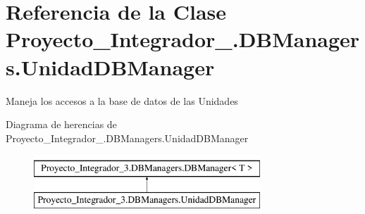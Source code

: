 \hypertarget{class_proyecto___integrador__3_1_1_d_b_managers_1_1_unidad_d_b_manager}{\section{Referencia de la Clase Proyecto\-\_\-\-Integrador\-\_.\-D\-B\-Managers.\-Unidad\-D\-B\-Manager}
\label{class_proyecto___integrador__3_1_1_d_b_managers_1_1_unidad_d_b_manager}
}


Maneja los accesos a la base de datos de las Unidades  


Diagrama de herencias de Proyecto\-\_\-\-Integrador\-\_.\-D\-B\-Managers.\-Unidad\-D\-B\-Manager\begin{figure}[H]
\begin{center}
\leavevmode
\includegraphics[height=2.000000cm]{d1/dfc/class_proyecto___integrador__3_1_1_d_b_managers_1_1_unidad_d_b_manager}
\end{center}
\end{figure}
